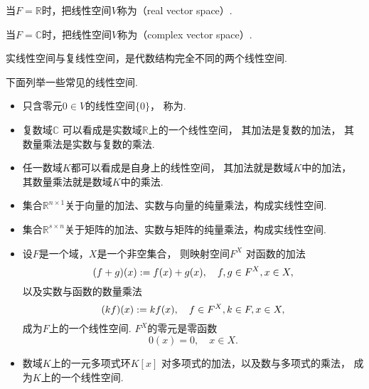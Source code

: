 当\(F = \mathbb{R}\)时，把线性空间\(V\)称为（real vector space）.

当\(F = \mathbb{C}\)时，把线性空间\(V\)称为（complex vector space）.

实线性空间与复线性空间，是代数结构完全不同的两个线性空间.

\begin{example}
下面列举一些常见的线性空间.
\begin{itemize}
	\item 只含零元\(0 \in V\)的线性空间\(\{0\}\)，
	称为.

	\item 复数域\(\mathbb{C}\)
	可以看成是实数域\(\mathbb{R}\)上的一个线性空间，
	其加法是复数的加法，
	其数量乘法是实数与复数的乘法.

	\item 任一数域\(K\)都可以看成是自身上的线性空间，
	其加法就是数域\(K\)中的加法，
	其数量乘法就是数域\(K\)中的乘法.

	\item 集合\(\mathbb{R}^{n \times 1}\)关于向量的加法、实数与向量的纯量乘法，构成实线性空间.

	\item 集合\(\mathbb{R}^{s \times n}\)关于矩阵的加法、实数与矩阵的纯量乘法，构成实线性空间.

	\item 设\(F\)是一个域，\(X\)是一个非空集合，
	则映射空间\(F^X\)
	对函数的加法\begin{equation*}
		(f+g)(x) := f(x) + g(x),
		\quad f,g \in F^X, x \in X,
	\end{equation*}
	以及实数与函数的数量乘法\begin{equation*}
		(k f)(x) := k f(x),
		\quad f \in F^X, k \in F, x \in X,
	\end{equation*}
	成为\(F\)上的一个线性空间.
	\(F^X\)的零元是零函数\begin{equation*}
		0(x) = 0,
		\quad x \in X.
	\end{equation*}

	\item 数域\(K\)上的一元多项式环\(K[x]\)
	对多项式的加法，以及数与多项式的乘法，
	成为\(K\)上的一个线性空间.
\end{itemize}
\end{example}

